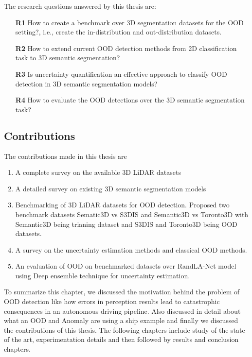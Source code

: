 The research questions answered by this thesis are:
\begin{itemize}
    \item[\textbf{R1}] How to create a benchmark over 3D segmentation datasets for the OOD setting?, i.e., create the in-distribution and out-distribution datasets.
    \item[\textbf{R2}] How to extend current OOD detection methods from 2D classification task to 3D semantic segmentation?
    \item[\textbf{R3}] Is uncertainty quantification an effective approach to classify OOD detection in 3D semantic segmentation models?
    \item[\textbf{R4}] How to evaluate the OOD detections over the 3D semantic segmentation task?
\end{itemize}

\subsection{Contributions}
The contributions made in this thesis are
\begin{enumerate}
    \item A complete survey on the available 3D LiDAR datasets
    \item A detailed survey on existing 3D semantic segmentation models
    \item Benchmarking of 3D LiDAR datasets for OOD detection. Proposed two benchmark datasets Sematic3D vs S3DIS and Semantic3D vs Toronto3D with Semantic3D being trianing dataset and S3DIS and Toronto3D being OOD datasets.
    \item A survey on the uncertainty estimation methods and classical OOD methods.
    \item An evaluation of OOD on benchmarked datasets over RandLA-Net model using Deep ensemble technique for uncertainty estimation.
\end{enumerate}

To summarize this chapter, we discussed the motivation behind the problem of OOD detection like how errors in perception results lead to catastrophic consequences in an autonomous driving pipeline.
Also discussed in detail about what an OOD and Anomaly are using a ship example and finally we discussed the contributions of this thesis.
The following chapters include study of the state of the art, experimentation details and then followed by results and conclusion chapters.

